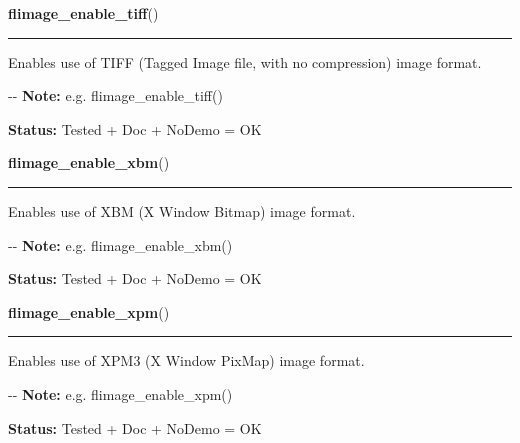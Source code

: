 \hspace{.8\funcindent}\begin{boxedminipage}{\funcwidth}

    \raggedright \textbf{flimage\_enable\_tiff}()

    \vspace{-1.5ex}

    \rule{\textwidth}{0.5\fboxrule}
\setlength{\parskip}{2ex}

Enables use of TIFF (Tagged Image file, with no compression) image
format.

-{}-
\setlength{\parskip}{1ex}
\textbf{Note:} 
e.g. flimage\_enable\_tiff()


\textbf{Status:} 
Tested + Doc + NoDemo = OK


    \end{boxedminipage}

    \label{xformslib:flflimage:flimage_enable_xbm}

    \vspace{0.5ex}

\hspace{.8\funcindent}\begin{boxedminipage}{\funcwidth}

    \raggedright \textbf{flimage\_enable\_xbm}()

    \vspace{-1.5ex}

    \rule{\textwidth}{0.5\fboxrule}
\setlength{\parskip}{2ex}

Enables use of XBM (X Window Bitmap) image format.

-{}-
\setlength{\parskip}{1ex}
\textbf{Note:} 
e.g. flimage\_enable\_xbm()


\textbf{Status:} 
Tested + Doc + NoDemo = OK


    \end{boxedminipage}

    \label{xformslib:flflimage:flimage_enable_xpm}

    \vspace{0.5ex}

\hspace{.8\funcindent}\begin{boxedminipage}{\funcwidth}

    \raggedright \textbf{flimage\_enable\_xpm}()

    \vspace{-1.5ex}

    \rule{\textwidth}{0.5\fboxrule}
\setlength{\parskip}{2ex}

Enables use of XPM3 (X Window PixMap) image format.

-{}-
\setlength{\parskip}{1ex}
\textbf{Note:} 
e.g. flimage\_enable\_xpm()


\textbf{Status:} 
Tested + Doc + NoDemo = OK


    \end{boxedminipage}

